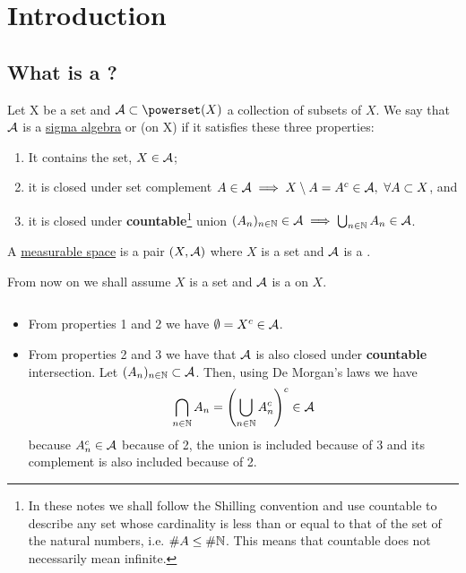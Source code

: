 
\chapter{Introduction}

\section{What is a \siga?}

\begin{dfn}
	Let X be a set and $\sa \subset \powerset(X)$ a collection of subsets of $X$. We say that $\mathcal{A}$ is a \underline{sigma algebra} or \siga (on X) if it satisfies these three properties:
	\begin{enumerate}
		\item It contains the set, $X \in \mathcal{A}$;
		\item it is closed under set complement $A \in \mathcal{A} \implies X \setminus A = A^c \in \mathcal{A},\ \forall A \subset X$, and
		\item it is closed under \textbf{countable}\footnote{In these notes we shall follow the Shilling convention and use countable to describe any set whose cardinality is less than or equal to that of the set of the natural numbers, i.e. $\# A \leq \# \mathbb{N}$. This means that countable does not necessarily mean infinite.} union $(A_n)_{n \in \mathbb{N}} \in \mathcal{A} \implies \bigcup_{n \in \mathbb{N}} A_n \in \mathcal{A}$.
	\end{enumerate}
\end{dfn}

\begin{dfn}
	A \underline{measurable space} is a pair $(X, \mathcal{A})$ where $X$ is a set and $\mathcal{A}$ is a \siga.
\end{dfn}

From now on we shall assume $X$ is a set and $\mathcal{A}$ is a \siga on $X$.

\begin{remark}$ $ \newline
	\begin{itemize}
		\item From properties 1 and 2 we have $\emptyset = X^c\in \mathcal{A}$.
		\item From properties 2 and 3 we have that $\mathcal{A}$ is also closed under \textbf{countable} intersection. Let $(A_n)_{n \in \mathbb{N}} \subset \mathcal{A}$. Then, using De Morgan's laws we have
		\begin{align*}
			\bigcap_{n \in \mathbb{N}} A_n = \left(\bigcup_{n \in \mathbb{N}} A_n^c\right)^c \in \mathcal{A}
		\end{align*}
		because $A_n^c \in \mathcal{A}$ because of 2, the union is included because of 3 and its complement is also included because of 2.
	\end{itemize}
\end{remark}

